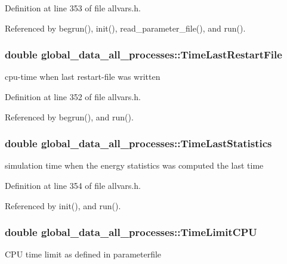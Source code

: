 Definition at line 353 of file allvars.h.



Referenced by begrun(), init(), read\_\-parameter\_\-file(), and run().

\hypertarget{structglobal__data__all__processes_a1042ebf3c648c2b23dca6fc65ff22785}{
\subsubsection[{TimeLastRestartFile}]{\setlength{\rightskip}{0pt plus 5cm}double {\bf global\_\-data\_\-all\_\-processes::TimeLastRestartFile}}}
\label{structglobal__data__all__processes_a1042ebf3c648c2b23dca6fc65ff22785}
cpu-\/time when last restart-\/file was written 

Definition at line 352 of file allvars.h.



Referenced by begrun(), and run().

\hypertarget{structglobal__data__all__processes_ab088f20e7889a88f2e0f652df4781e44}{
\subsubsection[{TimeLastStatistics}]{\setlength{\rightskip}{0pt plus 5cm}double {\bf global\_\-data\_\-all\_\-processes::TimeLastStatistics}}}
\label{structglobal__data__all__processes_ab088f20e7889a88f2e0f652df4781e44}
simulation time when the energy statistics was computed the last time 

Definition at line 354 of file allvars.h.



Referenced by init(), and run().

\hypertarget{structglobal__data__all__processes_accf0e0ec1acab3f51f583470910049d2}{
\subsubsection[{TimeLimitCPU}]{\setlength{\rightskip}{0pt plus 5cm}double {\bf global\_\-data\_\-all\_\-processes::TimeLimitCPU}}}
\label{structglobal__data__all__processes_accf0e0ec1acab3f51f583470910049d2}
CPU time limit as defined in parameterfile 


